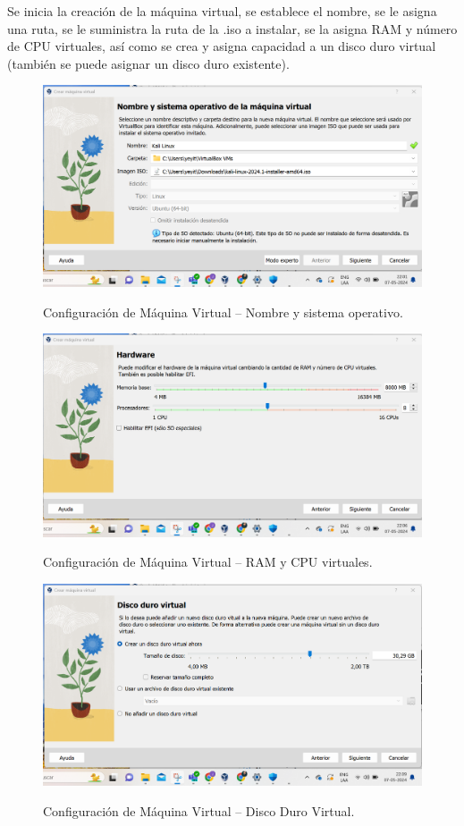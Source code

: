 \documentclass[stu, 11pt, letterpaper, donotrepeattitle, floatsintext, natbib]{apa7}
\begin{document}
Se inicia la creación de la máquina virtual, se establece el nombre, se le asigna una ruta, se le suministra la ruta de la .iso a instalar, se la asigna RAM y número de CPU virtuales, así como se crea y asigna capacidad a un disco duro virtual (también se puede asignar un disco duro existente).

\begin{figure}[H]
    \centering
    \caption{Configuración de Máquina Virtual – Nombre y sistema operativo.}
    \includegraphics[width=0.5\linewidth]{imagenCap2/13.png} %
    \label{fig:OverallEffect}
\end{figure}

\begin{figure}[H]
    \centering
    \caption{Configuración de Máquina Virtual – RAM y CPU virtuales.}
    \includegraphics[width=0.5\linewidth]{imagenCap2/14.png} %
    \label{fig:OverallEffect}
\end{figure}

\begin{figure}[H]
    \centering
    \caption{Configuración de Máquina Virtual – Disco Duro Virtual.}
    \includegraphics[width=0.5\linewidth]{imagenCap2/15.png} %
    \label{fig:OverallEffect}
\end{figure}
\end{document}
